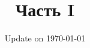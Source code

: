 \documentclass[12pt]{article}
\begin{document}
\fontsize{12}{12}\selectfont

\title{\bf \huge Часть I}
\date{Update on \today}
\maketitle 
\end{document}
